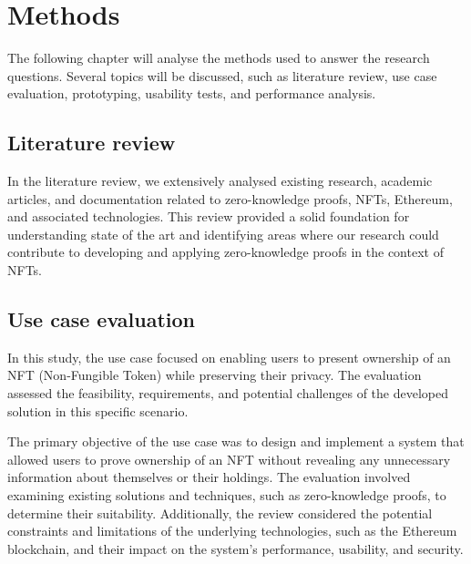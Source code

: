 \chapter{Methods}
The following chapter will analyse the methods used to answer the research questions. Several topics will be discussed, such as literature review, use case evaluation, prototyping, usability tests, and performance analysis.

\section{Literature review}
In the literature review, we extensively analysed existing research, academic articles, and documentation related to zero-knowledge proofs, NFTs, Ethereum, and associated technologies. This review provided a solid foundation for understanding state of the art and identifying areas where our research could contribute to developing and applying zero-knowledge proofs in the context of NFTs.

\section{Use case evaluation}
In this study, the use case focused on enabling users to present ownership of an NFT (Non-Fungible Token) while preserving their privacy. The evaluation assessed the feasibility, requirements, and potential challenges of the developed solution in this specific scenario.

The primary objective of the use case was to design and implement a system that allowed users to prove ownership of an NFT without revealing any unnecessary information about themselves or their holdings. The evaluation involved examining existing solutions and techniques, such as zero-knowledge proofs, to determine their suitability. Additionally, the review considered the potential constraints and limitations of the underlying technologies, such as the Ethereum blockchain, and their impact on the system's performance, usability, and security.

